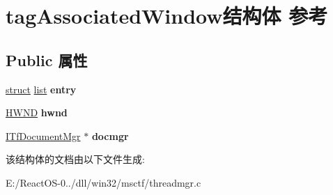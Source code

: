 \hypertarget{structtag_associated_window}{}\section{tag\+Associated\+Window结构体 参考}
\label{structtag_associated_window}
\subsection*{Public 属性}
\begin{DoxyCompactItemize}
\item 
\mbox{\label{structtag_associated_window_a8cee79fe5f76602b1d5b23184b31474a}} 
\hyperlink{interfacestruct}{struct} \hyperlink{classlist}{list} {\bfseries entry}
\item 
\mbox{\label{structtag_associated_window_a0b8621ea962e45407c370e9ec664e89f}} 
\hyperlink{interfacevoid}{H\+W\+ND} {\bfseries hwnd}
\item 
\mbox{\label{structtag_associated_window_ae840ae00d1e957d86f0f2a040a259575}} 
\hyperlink{interface_i_tf_document_mgr}{I\+Tf\+Document\+Mgr} $\ast$ {\bfseries docmgr}
\end{DoxyCompactItemize}


该结构体的文档由以下文件生成\+:\begin{DoxyCompactItemize}
\item 
E\+:/\+React\+O\+S-\/0../dll/win32/msctf/threadmgr.\+c\end{DoxyCompactItemize}
